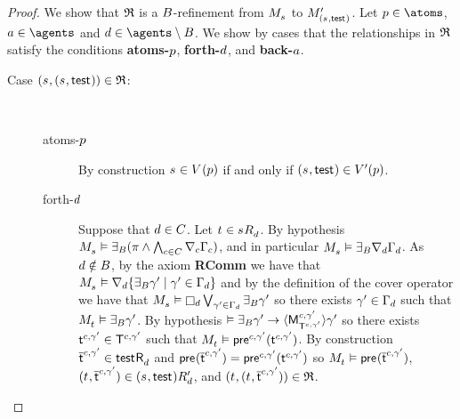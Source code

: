 \begin{proof}
We show that $\refinement$ is a $\agentsB$-refinement from $\kPModel{\kStateS}$ to $\kPModelP{(\kStateS, \aStateTest)}$.
Let $\atomP \in \atoms$, $\agentA \in \agents$ and $\agentD \in \agents \setminus \agentsB$.
We show by cases that the relationships in $\refinement$ satisfy the conditions {\bf atoms-$\atomP$}, {\bf forth-$\agentD$}, and {\bf back-$\agentA$}.

\begin{description}
    \item[{Case $(\kStateS, (\kStateS, \aStateTest)) \in \refinement$:}] \hfill \\
        \begin{description}
            \item[atoms-$\atomP$]
                By construction $\kStateS \in \kValuation(\atomP)$ if and only if $(\kStateS, \aStateTest) \in \kValuationP(\atomP)$.
            \item[forth-$\agentD$]
                Suppose that $\agentD \in \agentsC$.
                Let $\kStateT \in \kSuccessorsD{\kStateS}$.
                By hypothesis $\kPModel{\kStateS} \entails \someactsBs (\pi \land \bigwedge_{\agentC \in \agentsC} \coversC \Gamma_\agentC)$, and in particular $\kPModel{\kStateS} \entails \someactsBs \coversD \Gamma_\agentD$.
                As $\agentD \notin \agentsB$, by the \axiomAamlKFF{} axiom {\bf RComm} we have that $\kPModel{\kStateS} \entails \coversD \{\someactsBs \gamma' \mid \gamma' \in \Gamma_\agentD\}$ and by the definition of the cover operator we have that $\kPModel{\kStateS} \entails \necessaryD \bigvee_{\gamma' \in \Gamma_\agentD} \someactsBs \gamma'$ so there exists $\gamma' \in \Gamma_\agentD$ such that $\kPModel{\kStateT} \entails \someactsBs \gamma'$.
                By hypothesis $\entails \someactsBs \gamma' \implies \actionE{\aPModel[\agentC, \gamma']{\aStatesT[\agentC, \gamma']}} \gamma'$ so there exists $\aStateT[\agentC, \gamma'] \in \aStatesT[\agentC, \gamma']$ such that $\kPModel{\kStateT} \entails \aPrecondition[\agentC, \gamma'](\aStateT[\agentC, \gamma'])$.
                By construction $\aPStateT[\agentC, \gamma'] \in \aSuccessorsD{\aStateTest}$ and $\aPrecondition(\aPStateT[\agentC, \gamma']) = \aPrecondition[\agentC, \gamma'](\aStateT[\agentC, \gamma'])$ so $\kPModel{\kStateT} \entails \aPrecondition(\aPStateT[\agentC, \gamma'])$, $(\kStateT, \aPStateT[\agentC, \gamma']) \in \kSuccessorsPD{(\kStateS, \aStateTest)}$, and $(\kStateT, (\kStateT, \aPStateT[\agentC, \gamma'])) \in \refinement$.


\end{description}
\end{description}
\end{proof}
